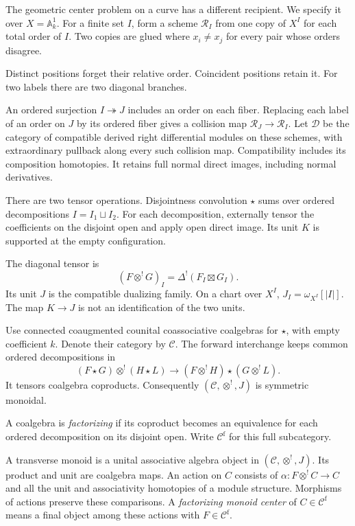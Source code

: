 The geometric center problem on a curve has a different
recipient. We specify it over $X=\mathbb A^1_k$. For a finite
set $I$, form a scheme $\mathscr R_I$ from one copy of $X^I$
for each total order of $I$. Two copies are glued where
$x_i\ne x_j$ for every pair whose orders disagree. 

Distinct
positions forget their relative order. Coincident positions
retain it. For two labels there are two diagonal branches.

An ordered surjection $I\twoheadrightarrow J$ includes an
order on each fiber. Replacing each label of an order on $J$
by its ordered fiber gives a collision map
$\mathscr R_J\to\mathscr R_I$. Let $\mathcal D$ be the
category of compatible derived right differential modules
on these schemes, with extraordinary pullback along every
such collision map. Compatibility includes its composition
homotopies. It retains full normal direct images, including
normal derivatives.

There are two tensor operations. Disjointness convolution $\star$ sums over ordered
decompositions $I=I_1\sqcup I_2$. For each decomposition,
externally tensor the coefficients on the disjoint open
and apply open direct image.
Its unit $K$ is supported at the empty configuration. 

The
diagonal tensor is
\[
 (F\otimes^!G)_I=\Delta^!(F_I\boxtimes G_I).
\]
Its unit $J$ is the compatible dualizing family. On a chart
over $X^I$, $J_I=\omega_{X^I}[|I|]$. The map $K\to J$ is
not an identification of the two units.

Use connected coaugmented counital coassociative coalgebras
for $\star$, with empty coefficient $k$. Denote their
category by $\mathcal C$. The forward interchange keeps
common ordered decompositions in
\[
 (F\star G)\otimes^!(H\star L)
       \longrightarrow(F\otimes^!H)\star(G\otimes^!L).
\]
It tensors coalgebra coproducts. Consequently
$(\mathcal C,\otimes^!,J)$ is symmetric monoidal.

A coalgebra is \emph{factorizing} if its coproduct becomes
an equivalence for each ordered decomposition on its
disjoint open. Write $\mathcal C^{\mathrm f}$ for this
full subcategory.

A transverse monoid is a unital associative algebra object
in $(\mathcal C,\otimes^!,J)$. Its product and unit are
coalgebra maps. An action on $C$ consists of
$\alpha:F\otimes^!C\to C$ and all the unit and
associativity homotopies of a module structure. Morphisms
of actions preserve these comparisons. A \emph{factorizing
monoid center} of $C\in\mathcal C^{\mathrm f}$ means a
final object among these actions with $F\in\mathcal C^{\mathrm f}$.

